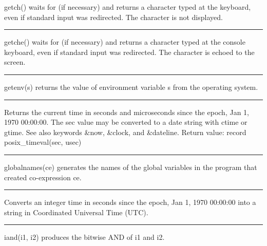 \noindent
\textsf{getch()} waits for (if necessary) and returns a character typed
at the keyboard, even if standard input was redirected.
The character is not displayed.

\bigskip\hrule\vspace{0.1cm}

\noindent
\textsf{getche()} waits for (if necessary) and returns a character typed
at the console keyboard, even if standard input was redirected. The
character is echoed to the screen.

\bigskip\hrule\vspace{0.1cm}

\noindent
\textsf{getenv(s)} returns the value of environment variable \textsf{s} from the operating system.

\bigskip\hrule\vspace{0.1cm}

\noindent
{}Returns the current time in seconds and microseconds
since the epoch, Jan 1, 1970 00:00:00. The \textsf{sec} value may be
converted to a date string with ctime or gtime. See also keywords
\textsf{\&now}, \textsf{\&clock}, and \textsf{\&dateline}. Return
value: \textsf{record posix\_timeval(sec, usec)} 

\bigskip\hrule\vspace{0.1cm}

\noindent
{}\textsf{globalnames(ce)} generates the names of the global
variables in the program that created co-expression \textsf{ce}.

\bigskip\hrule\vspace{0.1cm}

\noindent
Converts an integer time in seconds since the epoch, Jan 1, 1970
00:00:00 into a string in Coordinated Universal Time (UTC). 

\bigskip\hrule\vspace{0.1cm}

\noindent
{}\textsf{iand(i1, i2)} produces the bitwise AND of
\textsf{i1} and \textsf{i2}.

